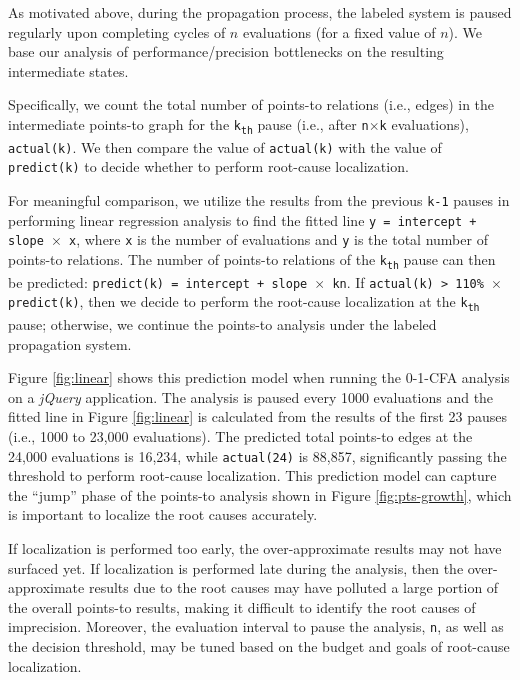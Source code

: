 As motivated above, during the propagation process, the labeled system is paused regularly upon completing cycles of $n$ evaluations (for a fixed value of $n$). We base our analysis of performance/precision bottlenecks on the resulting intermediate states.

Specifically, we count the total number of points-to relations (i.e., edges) in the intermediate points-to graph for the {\tt k\textsubscript{th}} pause (i.e., after {\tt n$\times$k} evaluations), {\tt actual(k)}. We then compare the value of {\tt actual(k)} with the value of {\tt predict(k)} to decide whether to perform root-cause localization. 

For meaningful comparison, we utilize the results from the previous {\tt k-1} pauses in performing linear regression analysis to find the fitted line {\tt y = intercept + slope $\times$ x}, where {\tt x} is the number of evaluations and {\tt y} is the total number of points-to relations. The number of points-to relations of the {\tt k\textsubscript{th}} pause can then be predicted: {\tt predict(k) = intercept + slope $\times$ kn}. If {\tt actual(k) > 110\% $\times$ predict(k)}, then we decide to perform the root-cause localization at the {\tt k\textsubscript{th}} pause; otherwise, we continue the points-to analysis under the labeled propagation system. 

Figure \ref{fig:linear} shows this prediction model when running the 0-1-CFA analysis on a {\it jQuery} application. The analysis is paused every 1000 evaluations and the fitted line in Figure \ref{fig:linear} is calculated from the results of the first 23 pauses (i.e., 1000 to 23,000 evaluations). The predicted total points-to edges at the 24,000 evaluations is 16,234, while {\tt actual(24)} is 88,857, significantly passing the threshold to perform root-cause localization. This prediction model can capture the ``jump'' phase of the points-to analysis shown in Figure \ref{fig:pts-growth}, which is important to localize the root causes accurately. 

If localization is performed too early, the over-approximate results may not have surfaced yet. If localization is performed late during the analysis, then the over-approximate results due to the root causes may have polluted a large portion of the overall points-to results, making it difficult to identify the root causes of imprecision. Moreover, the evaluation interval to pause the analysis, {\tt n}, as well as the decision threshold, may be tuned based on the budget and goals of root-cause localization.


